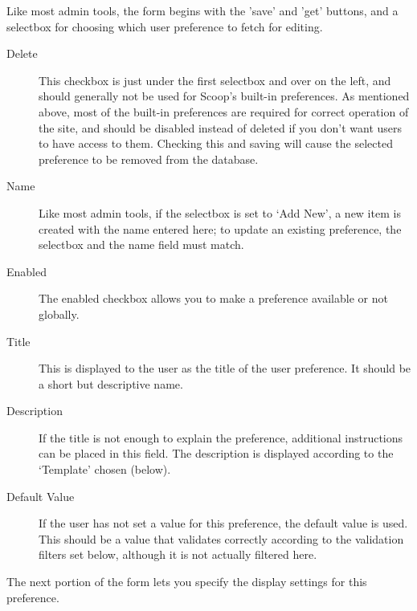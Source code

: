 Like most admin tools, the form begins with the 'save' and 'get' buttons, and a selectbox for choosing which user preference to fetch for editing.

\begin{description}
\item[Delete] This checkbox is just under the first selectbox and over on the left, and should generally not be used for Scoop's built-in preferences. As mentioned above, most of the built-in preferences are required for correct operation of the site, and should be disabled instead of deleted if you don't want users to have access to them. Checking this and saving will cause the selected preference to be removed from the database.
\item[Name] Like most admin tools, if the selectbox is set to `Add New', a new item is created with the name entered here; to update an existing preference, the selectbox and the name field must match.
\item[Enabled] The enabled checkbox allows you to make a preference available or not globally.
\item[Title] This is displayed to the user as the title of the user preference. It should be a short but descriptive name.
\item[Description] If the title is not enough to explain the preference, additional instructions can be placed in this field. The description is displayed according to the `Template' chosen (below).
\item[Default Value] If the user has not set a value for this preference, the default value is used. This should be a value that validates correctly according to the validation filters set below, although it is not actually filtered here.
\end{description}

The next portion of the form lets you specify the display settings for this preference.

